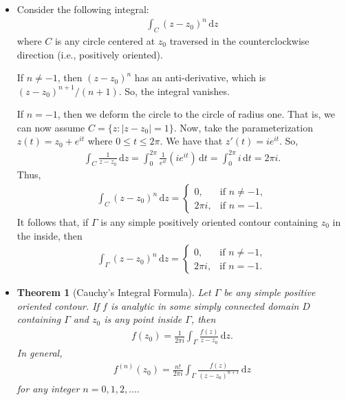 \documentclass[10pt]{article}
\newtheorem{theorem}[lemma]{Theorem}
\newcommand{\dee}{\mathrm{d}}
\begin{document}
\begin{itemize}
    \item Consider the following integral:
    \begin{align*}
      \int_C (z-z_0)^n\, \dee z
    \end{align*}
    where $C$ is any circle centered at $z_0$ traversed in the counterclockwise direction (i.e., positively oriented).

    If $n \neq -1$, then $(z-z_0)^n$ has an anti-derivative, which is $(z-z_0)^{n+1}/(n+1)$. So, the integral vanishes.

    If $n = -1$, then we deform the circle to the circle of radius one. That is, we can now assume $C = \{ z: |z - z_0| = 1\}$. Now, take the parameterization $z(t) = z_0 + e^{it}$ where $0 \leq t \leq 2\pi$. We have that $z'(t) = ie^{it}.$ So,
    \begin{align*}
      \int_C \frac{1}{z - z_0}\, \dee z = \int_{0}^{2\pi} \frac{1}{e^{it}} (i e^{it})\, \dee t = \int_{0}^{2\pi} i\, \dee t = 2\pi i.
    \end{align*}
    Thus,
    \begin{align*}
      \int_C (z-z_0)^n\, \dee z
      = \begin{cases}
        0, & \mbox{if } n \neq -1,\\
        2\pi i, & \mbox{if } n = -1.
      \end{cases}
    \end{align*}
    It follows that, if $\Gamma$ is any simple positively oriented contour containing $z_0$ in the inside, then
    \begin{align*}
      \int_\Gamma (z-z_0)^n\, \dee z
      = \begin{cases}
        0, & \mbox{if } n \neq -1,\\
        2\pi i, & \mbox{if } n = -1.
      \end{cases}
    \end{align*}

    \item \begin{theorem}[Cauchy's Integral Formula]
      Let $\Gamma$ be any simple positive oriented contour. If $f$ is analytic in some simply connected domain $D$ containing $\Gamma$ and $z_0$ is any point inside $\Gamma$, then
      \begin{align*}
        f(z_0) = \frac{1}{2\pi i} \int_\Gamma \frac{f(z)}{z-z_0}\, \dee z.
      \end{align*}
      In general,
      \begin{align*}
        f^{(n)}(z_0) = \frac{n!}{2\pi i} \int_{\Gamma} \frac{f(z)}{(z-z_0)^{n+1}}\, \dee z
      \end{align*}
      for any integer $n= 0, 1, 2, \dotsc$.
    \end{theorem}


\end{itemize}
\end{document}
